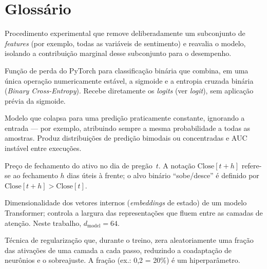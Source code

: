 \chapter*{Glossário}
\begin{description}[style=nextline,leftmargin=0pt,labelindent=0pt]

\item[\textit{Ablation} (ablação de \textit{features})] Procedimento experimental que remove deliberadamente um subconjunto de \textit{features} (por exemplo, todas as variáveis de sentimento) e reavalia o modelo, isolando a contribuição marginal desse subconjunto para o desempenho.

\item[\textit{BCEWithLogitsLoss}] Função de perda do PyTorch para classificação binária que combina, em uma única operação numericamente estável, a sigmoide e a entropia cruzada binária (\textit{Binary Cross-Entropy}). Recebe diretamente os \textit{logits} (ver \textit{logit}), sem aplicação prévia da sigmoide.

\item[Classificador degenerado] Modelo que colapsa para uma predição praticamente constante, ignorando a entrada --- por exemplo, atribuindo sempre a mesma probabilidade a todas as amostras. Produz distribuições de predição bimodais ou concentradas e AUC instável entre execuções.

\item[{$\text{Close}[t]$}] Preço de fechamento do ativo no dia de pregão~$t$. A notação $\text{Close}[t+h]$ refere-se ao fechamento $h$ dias úteis à frente; o alvo binário ``sobe/desce'' é definido por $\text{Close}[t+h] > \text{Close}[t]$.

\item[$d_\text{model}$] Dimensionalidade dos vetores internos (\textit{embeddings} de estado) de um modelo Transformer; controla a largura das representações que fluem entre as camadas de atenção. Neste trabalho, $d_\text{model}=64$.

\item[\textit{Dropout}] Técnica de regularização que, durante o treino, zera aleatoriamente uma fração das ativações de uma camada a cada passo, reduzindo a coadaptação de neurônios e o sobreajuste. A fração (ex.: 0,2 = 20\%) é um hiperparâmetro.


\end{description}
